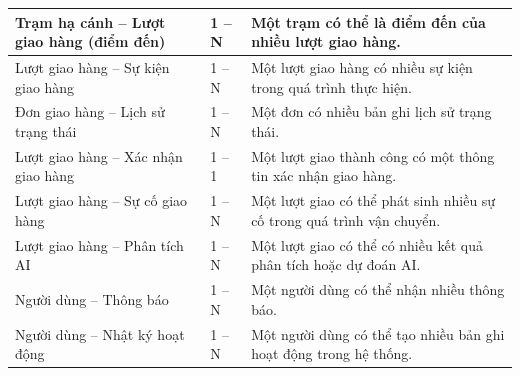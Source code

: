 \begin{longtable}{|L{4.5cm}|C{2cm}|L{7.5cm}|}
Trạm hạ cánh -- Lượt giao hàng (điểm đến)
& 1 -- N
& Một trạm có thể là điểm đến của nhiều lượt giao hàng.
\\ \hline

Lượt giao hàng -- Sự kiện giao hàng
& 1 -- N
& Một lượt giao hàng có nhiều sự kiện trong quá trình thực hiện.
\\ \hline

Đơn giao hàng -- Lịch sử trạng thái
& 1 -- N
& Một đơn có nhiều bản ghi lịch sử trạng thái.
\\ \hline

Lượt giao hàng -- Xác nhận giao hàng
& 1 -- 1
& Một lượt giao thành công có một thông tin xác nhận giao hàng.
\\ \hline

Lượt giao hàng -- Sự cố giao hàng
& 1 -- N
& Một lượt giao có thể phát sinh nhiều sự cố trong quá trình vận chuyển.
\\ \hline

Lượt giao hàng -- Phân tích AI
& 1 -- N
& Một lượt giao có thể có nhiều kết quả phân tích hoặc dự đoán AI.
\\ \hline

Người dùng -- Thông báo
& 1 -- N
& Một người dùng có thể nhận nhiều thông báo.
\\ \hline

Người dùng -- Nhật ký hoạt động
& 1 -- N
& Một người dùng có thể tạo nhiều bản ghi hoạt động trong hệ thống.

\end{longtable}